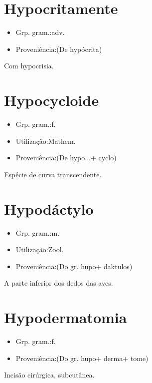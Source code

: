 \documentclass{article}
\begin{document}
\section{Hypocritamente}
\begin{itemize}
\item {Grp. gram.:adv.}
\end{itemize}
\begin{itemize}
\item {Proveniência:(De \textunderscore hypócrita\textunderscore )}
\end{itemize}
Com hypocrisia.
\section{Hypocycloide}
\begin{itemize}
\item {Grp. gram.:f.}
\end{itemize}
\begin{itemize}
\item {Utilização:Mathem.}
\end{itemize}
\begin{itemize}
\item {Proveniência:(De \textunderscore hypo...\textunderscore  + \textunderscore cyclo\textunderscore )}
\end{itemize}
Espécie de curva transcendente.
\section{Hypodáctylo}
\begin{itemize}
\item {Grp. gram.:m.}
\end{itemize}
\begin{itemize}
\item {Utilização:Zool.}
\end{itemize}
\begin{itemize}
\item {Proveniência:(Do gr. \textunderscore hupo\textunderscore  + \textunderscore daktulos\textunderscore )}
\end{itemize}
A parte inferior dos dedos das aves.
\section{Hypodermatomia}
\begin{itemize}
\item {Grp. gram.:f.}
\end{itemize}
\begin{itemize}
\item {Proveniência:(Do gr. \textunderscore hupo\textunderscore  + \textunderscore derma\textunderscore  + \textunderscore tome\textunderscore )}
\end{itemize}
Incisão cirúrgica, subcutânea.
\end{document}
